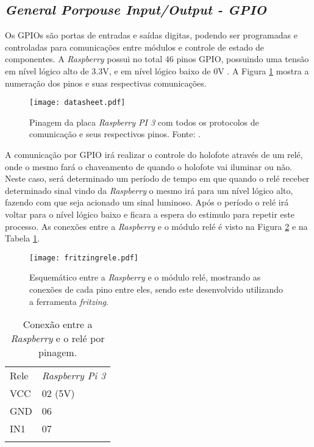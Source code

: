 \subsection{\emph{General Porpouse Input/Output - GPIO}}
Os GPIOs são portas de entradas e saídas digitas, podendo ser programadas e controladas para comunicações entre módulos e controle de estado de componentes. A \emph{Raspberry} possui no total 46 pinos GPIO, possuindo uma tensão em nível lógico alto de 3.3V, e em nível lógico baixo de 0V \cite{gpio1}. A Figura \ref{datasheet} mostra a numeração dos pinos e suas respectivas comunicações.
\begin{figure}[H]
    \centering
    \texttt{[image: datasheet.pdf]}
    \caption {Pinagem da placa \emph{Raspberry PI 3} com todos os protocolos de comunicação e seus respectivos pinos. Fonte: \cite{gpio}.}
    \label{datasheet}
\end{figure}
A comunicação por GPIO irá realizar o controle do holofote através de um relé, onde o mesmo fará o chaveamento de quando o holofote vai iluminar ou não. Neste caso, será determinado um período de tempo em que quando o relé receber determinado sinal vindo da \emph{Raspberry} o mesmo irá para um nível lógico alto, fazendo com que seja acionado um sinal luminoso. Após o período o relé irá voltar para o nível lógico baixo e ficara a espera do estimulo para repetir este processo.  As conexões entre a \emph{Raspberry} e o módulo relé é visto na Figura \ref{fritizingrele} e na Tabela \ref{tabelarele}.
    \begin{figure}[H]
    \centering
    \texttt{[image: fritzingrele.pdf]}
    \caption{Esquemático entre a \emph{Raspberry} e o módulo relé, mostrando as conexões de cada pino entre eles, sendo este desenvolvido utilizando a ferramenta \emph{fritzing}.}
    \label{fritizingrele}
\end{figure}
  \begin{table}[h]
 \centering
 {\renewcommand\arraystretch{1.25}
 \caption{Conexão entre a \emph{Raspberry} e o relé por pinagem.}
 \begin{tabular}{ l l }
  \cline{1-1}\cline{2-2}  
    \multicolumn{1}{|p{3.850cm}|}{Rele \centering } &
    \multicolumn{1}{p{4.217cm}|}{\emph{Raspberry Pi 3} \centering }
  \\  
  \cline{1-1}\cline{2-2}  
    \multicolumn{1}{|p{3.850cm}|}{VCC \centering } &
    \multicolumn{1}{p{4.217cm}|}{02 (5V) \centering }
  \\  
  \cline{1-1}\cline{2-2}  
    \multicolumn{1}{|p{3.850cm}|}{GND \centering } &
    \multicolumn{1}{p{4.217cm}|}{06  \centering }
  \\  
  \cline{1-1}\cline{2-2}  
    \multicolumn{1}{|p{3.850cm}|}{IN1 \centering } &
    \multicolumn{1}{p{4.217cm}|}{07 \centering }
  \\  
   \hline
\label{tabelarele}
 \end{tabular} }
\end{table}  
